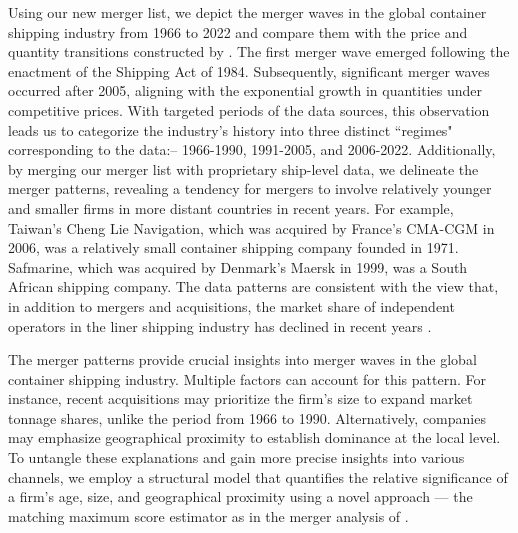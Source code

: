\documentclass[10pt]{article}
\begin{document}
Using our new merger list, we depict the merger waves in the global container shipping industry from 1966 to 2022 and compare them with the price and quantity transitions constructed by \cite{matsuda2022unified}.
The first merger wave emerged following the enactment of the Shipping Act of 1984. 
Subsequently, significant merger waves occurred after 2005, aligning with the exponential growth in quantities under competitive prices. With targeted periods of the data sources, this observation leads us to categorize the industry's history into three distinct ``regimes" corresponding to the data:--  1966-1990, 1991-2005, and 2006-2022.
Additionally, by merging our merger list with proprietary ship-level data, we delineate the merger patterns, revealing a tendency for mergers to involve relatively younger and smaller firms in more distant countries in recent years.
For example, Taiwan's Cheng Lie Navigation, which was acquired by France's CMA-CGM in 2006, was a relatively small container shipping company founded in 1971. 
Safmarine, which was acquired by Denmark's Maersk in 1999, was a South African shipping company. 
The data patterns are consistent with the view that, in addition to mergers and acquisitions, the market share of independent operators in the liner shipping industry has declined in recent years \citep{Merk2022MEL}. 

The merger patterns provide crucial insights into merger waves in the global container shipping industry.
Multiple factors can account for this pattern. 
For instance, recent acquisitions may prioritize the firm's size to expand market tonnage shares, unlike the period from 1966 to 1990. 
Alternatively, companies may emphasize geographical proximity to establish dominance at the local level.
To untangle these explanations and gain more precise insights into various channels, we employ a structural model that quantifies the relative significance of a firm's age, size, and geographical proximity using a novel approach — the matching maximum score estimator \citep{fox2018qe} as in the merger analysis of \cite{akkus2015ms}.
\end{document}
